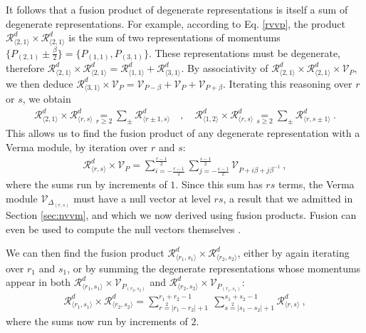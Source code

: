 \documentclass[12pt, a4paper]{article}
\theoremstyle{break}
\begin{document}
It follows that a fusion product of degenerate representations is itself a sum of degenerate representations. 
For example, according to Eq. \eqref{rvvp}, the product $\mathcal{R}^d_{\langle 2,1\rangle}\times\mathcal{R}^d_{\langle 2,1\rangle}$ is the sum of two representations of momentums $\{P_{(2,1)} \pm \frac{\beta}{2}\} = \{P_{(1,1)},P_{(3,1)}\}$. These representations must be degenerate, therefore $\mathcal{R}^d_{\langle 2,1\rangle}\times\mathcal{R}^d_{\langle 2,1\rangle}=\mathcal{R}^d_{\langle 1,1\rangle}+\mathcal{R}^d_{\langle 3,1\rangle}$. By associativity of $\mathcal{R}^d_{\langle 2,1\rangle}\times\mathcal{R}^d_{\langle 2,1\rangle}\times \mathcal{V}_P$, we then deduce 
$
 \mathcal{R}^d_{\langle 3,1\rangle} \times \mathcal{V}_P = \mathcal{V}_{P-\beta}+\mathcal{V}_P+\mathcal{V}_{P+\beta}
$. Iterating this reasoning over $r$ or $s$, we obtain 
\begin{align}
 \mathcal{R}^d_{\langle 2,1\rangle}\times \mathcal{R}^d_{\langle r,s\rangle} 
 \underset{r\geq 2}{=} \sum_\pm \mathcal{R}^d_{\langle r\pm 1,s\rangle} 
 \quad , \quad 
 \mathcal{R}^d_{\langle 1,2\rangle}\times \mathcal{R}^d_{\langle r,s\rangle} 
 \underset{s\geq 2}{=}\sum_\pm \mathcal{R}^d_{\langle r,s\pm 1\rangle} \ .
 \label{rrrs}
\end{align}
This allows us to find the fusion product of any degenerate representation with a Verma module, by iteration over $r$ and $s$:
\begin{align}
 \boxed{\mathcal{R}^d_{\langle r,s\rangle}\times \mathcal{V}_P = \sum_{i=-\frac{r-1}{2}}^{\frac{r-1}{2}} \sum_{j=-\frac{s-1}{2}}^{\frac{s-1}{2}} \mathcal{V}_{P+i\beta +j\beta^{-1}}}\ ,
 \label{rrsvp}
\end{align}
where the sums run by increments of $1$. Since this sum has $rs$ terms, the Verma module $\mathcal{V}_{\Delta_{(r,s)}}$ must have a null vector at level $rs$, a result that we admitted in Section \ref{sec:nvvm}, and which we now derived using fusion products. Fusion can even be used to compute the null vectors themselves \cite{fms97}. 

We can then find the fusion product $\mathcal{R}^d_{\langle r_1,s_1\rangle}\times \mathcal{R}^d_{\langle r_2,s_2\rangle}$, either by again iterating over $r_1$ and $s_1$, or by summing the degenerate representations whose momentums appear in both  $\mathcal{R}^d_{\langle r_1,s_1\rangle}\times \mathcal{V}_{P_{(r_2,s_2)}}$ and $\mathcal{R}^d_{\langle r_2,s_2\rangle}\times \mathcal{V}_{P_{(r_1,s_1)}}$:
\begin{align}
  \boxed{\mathcal{R}^d_{\langle r_1,s_1 \rangle} \times \mathcal{R}^d_{\langle r_2,s_2 \rangle} = \sum_{r\overset{2}{=}|r_1-r_2|+1}^{r_1+r_2-1}\ \sum_{s\overset{2}{=}|s_1-s_2|+1}^{s_1+s_2-1} \mathcal{R}^d_{\langle r,s \rangle}}\ ,
  \label{rrsr}
\end{align}
where the sums now run by increments of $2$. 
\end{document}
